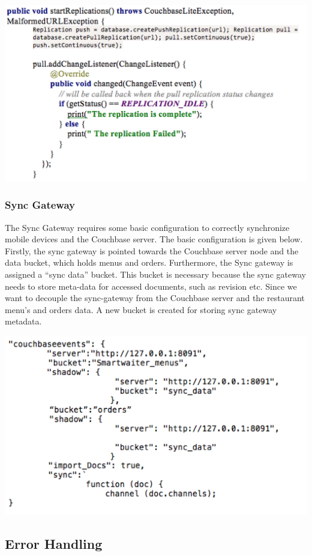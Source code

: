 \documentclass[12pt, titlepage]{article}
\begin{document}
\includegraphics[width=150mm,scale=0.5]{replications.png}

\subsubsection{Sync Gateway}

The Sync Gateway requires some basic configuration to correctly synchronize mobile devices and the Couchbase server. The basic configuration is given below. Firstly, the sync gateway is pointed towards the Couchbase server node and the data bucket, which holds menus and orders. Furthermore, the Sync gateway is assigned a “sync data” bucket. This bucket is necessary because the sync gateway needs to store meta-data for accessed documents, such as revision etc. Since we want to decouple the sync-gateway from the Couchbase server and the restaurant menu’s and orders data. A new bucket is created for storing sync gateway metadata. 

\includegraphics[width=150mm,scale=0.5]{jsonCouchbase.png}

\subsection{Error Handling}
\end{document}
